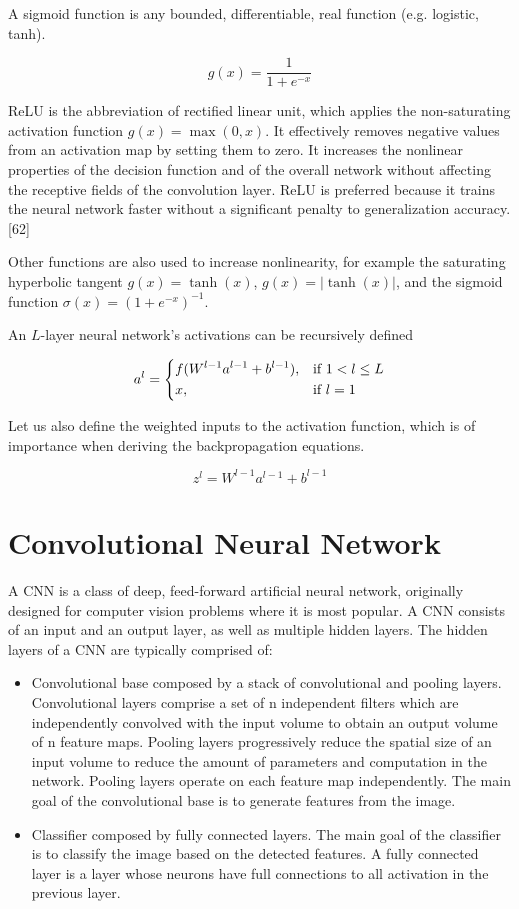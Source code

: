 A sigmoid function is any bounded, differentiable, real function (e.g. logistic, tanh).

$$
g(x) = \frac{1}{1 + e^{-x}}
$$

ReLU is the abbreviation of rectified linear unit, which applies the non-saturating activation function $g(x)=\max(0,x)$. It effectively removes negative values from an activation map by setting them to zero. It increases the nonlinear properties of the decision function and of the overall network without affecting the receptive fields of the convolution layer. ReLU is preferred because it trains the neural network faster without a significant penalty to generalization accuracy.[62]

Other functions are also used to increase nonlinearity, for example the saturating hyperbolic tangent $g(x)=\tanh(x)$, $g(x)=|\tanh(x)|$, and the sigmoid function $\sigma (x)=(1+e^{-x})^{-1}$.

An $L$-layer neural network's activations can be recursively defined

$$
a^{l} =
\begin{dcases}
    f(W^{l-1}a^{l-1} + b^{l-1}),& \text{if } 1 < l \leq L\\
    x,              & \text{if } l = 1
\end{dcases}
$$

Let us also define the weighted inputs to the activation function, which is of importance when deriving the backpropagation equations.

$$
z^{l} = W^{l-1}a^{l-1} + b^{l-1}
$$

\section{Convolutional Neural Network}

A \ac{CNN} is a class of deep, feed-forward artificial neural network, originally designed for computer vision problems where it is most popular. A \ac{CNN} consists of an input and an output layer, as well as multiple hidden layers. The hidden layers of a \ac{CNN} are typically comprised of:

\begin{itemize}
    \item Convolutional base composed by a stack of convolutional and pooling layers. Convolutional layers comprise a set of n independent filters which are independently convolved with the input volume to obtain an output volume of n feature maps. Pooling layers progressively reduce the spatial size of an input volume to reduce the amount of parameters and computation in the network. Pooling layers operate on each feature map independently. The main goal of the convolutional base is to generate features from the image.
    \item Classifier composed by fully connected layers. The main goal of the classifier is to classify the image based on the detected features. A fully connected layer is a layer whose neurons have full connections to all activation in the previous layer.
\end{itemize}

